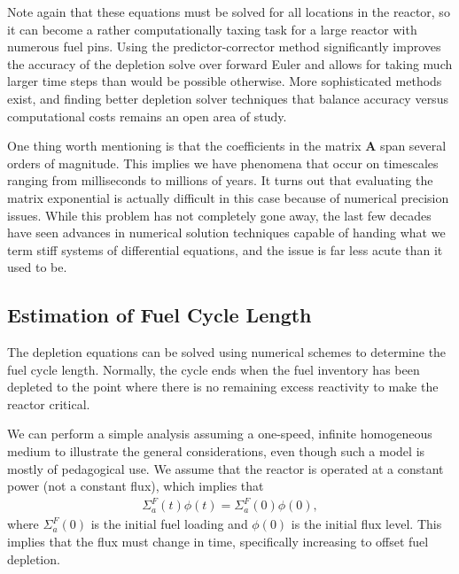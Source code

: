 Note again that these equations must be solved for all locations in the reactor, so it can become a rather computationally taxing task for a large reactor with numerous fuel pins. Using the predictor-corrector method significantly improves the accuracy of the depletion solve over forward Euler and allows for taking much larger time steps than would be possible otherwise. More sophisticated methods exist, and finding better depletion solver techniques that balance accuracy versus computational costs remains an open area of study.

One thing worth mentioning is that the coefficients in the matrix $\mathbf{A}$ span several orders of magnitude. This implies we have phenomena that occur on timescales ranging from milliseconds to millions of years. It turns out that evaluating the matrix exponential is actually difficult in this case because of numerical precision issues. While this problem has not completely gone away, the last few decades have seen advances in numerical solution techniques capable of handing what we term stiff systems of differential equations, and the issue is far less acute than it used to be.

\subsection{Estimation of Fuel Cycle Length}

The depletion equations can be solved using numerical schemes to determine the fuel cycle length. Normally, the cycle ends when the fuel inventory has been depleted to the point where there is no remaining excess reactivity to make the reactor critical.

We can perform a simple analysis assuming a one-speed, infinite homogeneous medium to illustrate the general considerations, even though such a model is mostly of pedagogical use. We assume that the reactor is operated at a constant power (not a constant flux), which implies that
\begin{align}
  \Sigma_a^F(t) \phi(t) = \Sigma_a^F(0) \phi(0) , \label{Eq:kinetics_simplifiedBurnup_constantPowerFuelXS}
\end{align}
where $\Sigma_a^F(0)$ is the initial fuel loading and $\phi(0)$ is the initial flux level. This implies that the flux must change in time, specifically increasing to offset fuel depletion.

